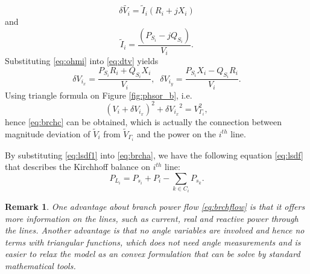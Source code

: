 \documentclass{article}
\newtheorem{remark}{Remark}[section]
\begin{document}
\begin{equation}
    \delta \tilde{V_i} = \tilde I_i (R_i+jX_i) \label{eq:dtv}
\end{equation}
and
\begin{equation}
    \tilde I_i = \frac{(P_{S_i}-jQ_{S_i})}{V_i}\label{eq:ohmi}.
\end{equation}
Substituting \eqref{eq:ohmi} into \eqref{eq:dtv} yields
\begin{equation*}
    \delta {V_{i_x}} = \frac{P_{S_i}R_i+Q_{S_i}X_i}{V_i},\;\;\delta {V_{i_y}} = \frac{P_{S_i}X_i-Q_{S_i}R_i}{V_i}.
\end{equation*}
Using triangle formula on Figure \ref{fig:phsor_b}, i.e. 
\begin{equation}
  (V_i+ \delta {V_{i_x}})^2 + \delta {V_{i_x}}^2 = V_{\Gamma_i}^2,
\end{equation}
hence \eqref{eq:brchc} can be obtained, which is actually the connection between magnitude deviation of $\tilde V_i$ from $\tilde V_{\Gamma_i}$ and the power on the $i^{th}$ line.

By substituting \eqref{eq:lsdf1} into \eqref{eq:brcha}, we have the following equation \eqref{eq:lsdf} that describes the Kirchhoff balance on $i^{th}$ line:
\begin{equation}
	P_{L_i}=  P_{s_i} + P_i-\sum_{k \in C_i}P_{s_k}.
	\label{eq:lsdf}
\end{equation}

\begin{remark}
One advantage about branch power flow \eqref{eq:brchflow} is that it offers more information on the lines, such as current, real and reactive power through the lines. Another advantage is that no angle variables are involved and hence no terms with triangular functions, which does not need angle measurements and is easier to relax the model as an convex formulation that can be solve by standard mathematical tools. 
\end{remark}
\end{document}

